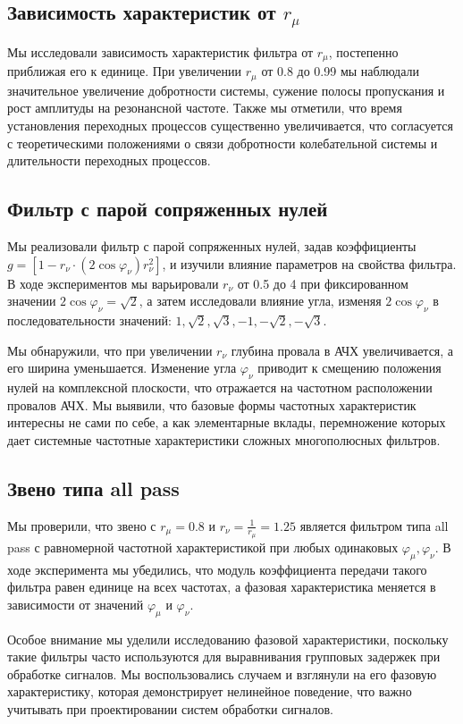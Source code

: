 \subsection{Зависимость характеристик от $r_\mu$}
Мы исследовали зависимость характеристик фильтра от $r_\mu$, постепенно приближая его к единице. При увеличении $r_\mu$ от 0.8 до 0.99 мы наблюдали значительное увеличение добротности системы, сужение полосы пропускания и рост амплитуды на резонансной частоте. Также мы отметили, что время установления переходных процессов существенно увеличивается, что согласуется с теоретическими положениями о связи добротности колебательной системы и длительности переходных процессов.

\subsection{Фильтр с парой сопряженных нулей}
Мы реализовали фильтр с парой сопряженных нулей, задав коэффициенты $g = [1 - r_\nu \cdot (2\cos\varphi_\nu) r_\nu^2]$, и изучили влияние параметров на свойства фильтра. В ходе экспериментов мы варьировали $r_\nu$ от 0.5 до 4 при фиксированном значении $2\cos\varphi_\nu = \sqrt{2}$, а затем исследовали влияние угла, изменяя $2\cos\varphi_\nu$ в последовательности значений: $1, \sqrt{2}, \sqrt{3}, -1, -\sqrt{2}, -\sqrt{3}$.

Мы обнаружили, что при увеличении $r_\nu$ глубина провала в АЧХ увеличивается, а его ширина уменьшается. Изменение угла $\varphi_\nu$ приводит к смещению положения нулей на комплексной плоскости, что отражается на частотном расположении провалов АЧХ. Мы выявили, что базовые формы частотных характеристик интересны не сами по себе, а как элементарные вклады, перемножение которых дает системные частотные характеристики сложных многополюсных фильтров.

\subsection{Звено типа all pass}
Мы проверили, что звено с $r_\mu = 0.8$ и $r_\nu = \frac{1}{r_\mu} = 1.25$ является фильтром типа all pass с равномерной частотной характеристикой при любых одинаковых $\varphi_\mu, \varphi_\nu$. В ходе эксперимента мы убедились, что модуль коэффициента передачи такого фильтра равен единице на всех частотах, а фазовая характеристика меняется в зависимости от значений $\varphi_\mu$ и $\varphi_\nu$.

Особое внимание мы уделили исследованию фазовой характеристики, поскольку такие фильтры часто используются для выравнивания групповых задержек при обработке сигналов. Мы воспользовались случаем и взглянули на его фазовую характеристику, которая демонстрирует нелинейное поведение, что важно учитывать при проектировании систем обработки сигналов.


